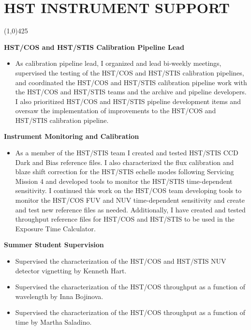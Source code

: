 \documentclass{res}
\begin{document}
\begin{resume}
\begin{itemize}
		\end{itemize}

\section{HST INSTRUMENT SUPPORT} 
\vspace{-.2in}
\begin{center}
\line(1,0){425}
\end{center}
\vspace{-.3in}
\vspace{0.1in}

	{\bf HST/COS and HST/STIS Calibration Pipeline Lead}
		\begin{itemize}
		\item[]  As calibration pipeline lead, I organized and lead bi-weekly meetings, supervised the testing of the HST/COS and HST/STIS calibration pipelines, and coordinated the HST/COS and HST/STIS calibration pipeline work with the HST/COS and HST/STIS teams and the archive and pipeline developers. I also prioritized HST/COS and HST/STIS pipeline development items and oversaw the implementation of improvements to the HST/COS and HST/STIS calibration pipeline.
		\end{itemize}


   {\bf  Instrument Monitoring and Calibration}
        \begin{itemize}
        \item[]  As a member of the HST/STIS team I created and tested HST/STIS CCD Dark and Bias reference files. I also characterized the flux calibration and blaze shift correction for the HST/STIS echelle modes following Servicing Mission 4 and developed tools to monitor the HST/STIS time-dependent sensitivity. I continued this work on the HST/COS team developing tools to monitor the HST/COS FUV and NUV time-dependent sensitivity and create and test new reference files as needed. Additionally, I have created and tested throughput reference files for HST/COS and HST/STIS to be used in the Exposure Time Calculator.
		\end{itemize}
		
	{\bf Summer Student Supervision}
		\begin{itemize}
		\item[]  Supervised the characterization of the HST/COS and HST/STIS NUV detector vignetting by Kenneth Hart.
		\item[]  Supervised the characterization of the HST/COS throughput as a function of wavelength by Inna Bojinova.
		\item[]  Supervised the characterization of the HST/COS throughput as a function of time by Martha Saladino.
		\end{itemize}


\end{resume}
\end{document}
